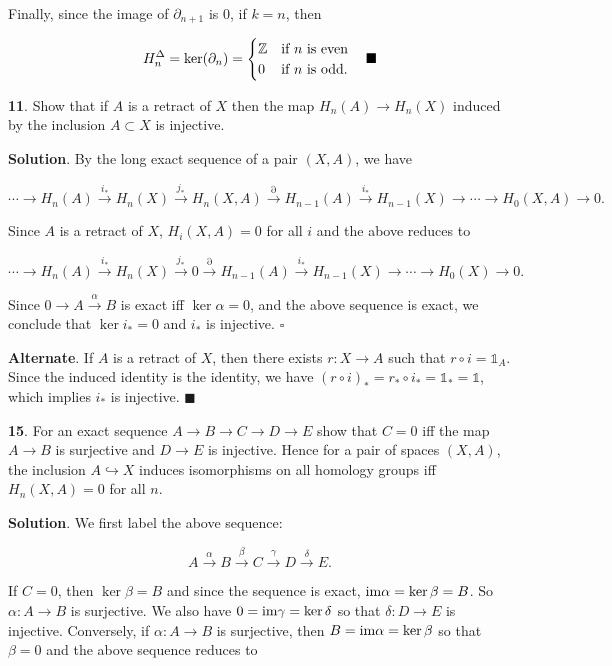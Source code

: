\documentclass{article}
\newcommand{\Z}{\mathbb{Z}}
\newcommand{\identity}{\mathds{1}}
\newcommand{\im}{\textnormal{im}}
\begin{document}
Finally, since the image of $\partial_{n+1}$ is 0, if $k = n$, then

$$H^{\Delta}_{n} = \ker (\partial_{n}) = \begin{cases}\Z & \textnormal{if $n$ is even}\\ 0 & \textnormal{if $n$ is odd}.\end{cases}\quad \blacksquare$$
\bigskip

\textbf{11}. Show that if $A$ is a retract of $X$ then the map $H_{n}(A)\to H_{n}(X)$ induced by the inclusion $A\subset X$ is injective.
\medskip

\textbf{Solution}. By the long exact sequence of a pair $(X, A)$, we have

$$\cdots \to H_{n}(A)\xrightarrow{i_{\ast}} H_{n}(X)\xrightarrow{j_{\ast}}H_{n}(X, A)\xrightarrow{\partial} H_{n-1}(A)\xrightarrow{i_{\ast}} H_{n-1}(X)\to \cdots \to H_{0}(X, A)\to 0.$$

Since $A$ is a retract of $X$, $H_{i}(X, A) = 0$ for all $i$ and the above reduces to

$$\cdots \to H_{n}(A)\xrightarrow{i_{\ast}} H_{n}(X)\xrightarrow{j_{\ast}}0\xrightarrow{\partial} H_{n-1}(A)\xrightarrow{i_{\ast}} H_{n-1}(X)\to \cdots \to H_{0}(X)\to 0.$$

Since $0\to A\xrightarrow{\alpha} B$ is exact iff $\ker \alpha = 0$, and the above sequence is exact, we conclude that $\ker i_{\ast} = 0$ and $i_{\ast}$ is injective. $\square$
\medskip

\textbf{Alternate}. If $A$ is a retract of $X$, then there exists $r: X\to A$ such that $r\circ i = \identity_{A}$. Since the induced identity is the identity, we have $(r\circ i)_{\ast} = r_{\ast}\circ i_{\ast} = \identity_{\ast} = \identity$, which implies $i_{\ast}$ is injective. $\blacksquare$
\bigskip
\bigskip

\textbf{15}. For an exact sequence $A\to B\to C\to D\to E$ show that $C = 0$ iff the map $A\to B$ is surjective and $D\to E$ is injective. Hence for a pair of spaces $(X, A)$, the inclusion $A\hookrightarrow X$ induces isomorphisms on all homology groups iff $H_{n}(X, A) = 0$ for all $n$.
\medskip

\textbf{Solution}. We first label the above sequence:

$$A\xrightarrow{\alpha} B\xrightarrow{\beta} C\xrightarrow{\gamma} D\xrightarrow{\delta} E.$$

If $C = 0$, then $\ker \beta = B$ and since the sequence is exact, $\im \alpha = \ker \beta = B$. So $\alpha: A\to B$ is surjective. We also have $0 = \im \gamma = \ker \delta$ so that $\delta:D\to E$ is injective. Conversely, if $\alpha: A\to B$ is surjective, then $B = \im \alpha = \ker \beta$ so that $\beta = 0$ and the above sequence reduces to
\end{document}
